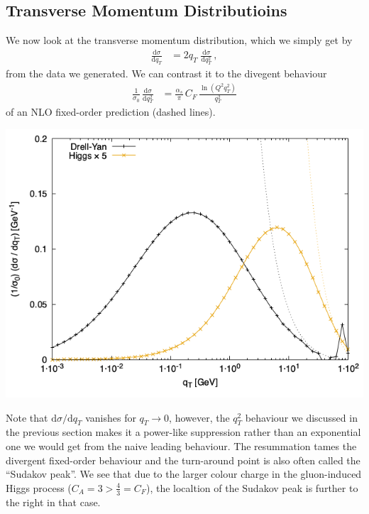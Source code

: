 \documentclass[11pt]{article}
\begin{document}
\subsection{Transverse Momentum Distributioins}
\label{sec:orga755d2d}
We now look at the transverse momentum distribution, which we simply get by
\begin{align}
  \frac{\mathrm{d}\sigma}{\mathrm{d}q_T}
  &=
  2 q_T \; \frac{\mathrm{d}\sigma}{\mathrm{d}q_T^2}
  \,,
\end{align}
from the data we generated.
We can contrast it to the divegent behaviour
\begin{align}
  \frac{1}{\sigma_0}\,\frac{\mathrm{d}\sigma}{\mathrm{d}q_T^2}
  &=
  \frac{\alpha_s}{\pi}\, C_F \, \frac{\ln(Q^2 q_T^2)}{q_T^2}
\end{align}
of an NLO fixed-order prediction (dashed lines).
\begin{center}
\includegraphics[width=.9\linewidth]{plot_dy.png}
\end{center}
Note that \(\mathrm{d}\sigma/\mathrm{d}q_T\) vanishes for \(q_T\to0\), however, the \(q_T^2\) behaviour we discussed in the previous section makes it a power-like suppression rather than an exponential one we would get from the naive leading behaviour.
The resummation tames the divergent fixed-order behaviour and the turn-around point is also often called the ``Sudakov peak''.
We see that due to the larger colour charge in the gluon-induced Higgs process (\(C_A = 3 > \tfrac{4}{3} = C_F\)), the localtion of the Sudakov peak is further to the right in that case.
\end{document}
